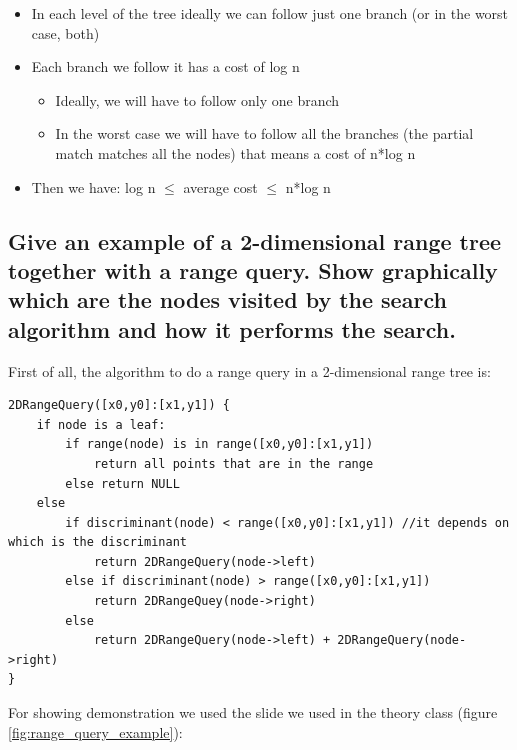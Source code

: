 \documentclass{article}
\begin{document}
\begin{itemize}
    \item In each level of the tree ideally we can follow just one branch (or in the worst case, both)
    \item Each branch we follow it has a cost of log n
    \begin{itemize}
        \item Ideally, we will have to follow only one branch
        \item In the worst case we will have to follow all the branches (the partial match matches all the nodes) that means a cost of n*log n
    \end{itemize}
    \item Then we have: log n $\leq$ average cost $\leq$ n*log n 
\end{itemize}


\subsection{Give an example of a 2-dimensional range tree together with a range query.
Show graphically which are the nodes visited by the search algorithm and
how it performs the search.}

First of all, the algorithm to do a range query in a 2-dimensional range tree is:
\begin{lstlisting}[caption=Algorithm to do a range query, style=myC]
2DRangeQuery([x0,y0]:[x1,y1]) {
    if node is a leaf:
        if range(node) is in range([x0,y0]:[x1,y1])
            return all points that are in the range
        else return NULL
    else
        if discriminant(node) < range([x0,y0]:[x1,y1]) //it depends on which is the discriminant
            return 2DRangeQuery(node->left)
        else if discriminant(node) > range([x0,y0]:[x1,y1])
            return 2DRangeQuey(node->right)
        else
            return 2DRangeQuery(node->left) + 2DRangeQuery(node->right)
}
\end{lstlisting}

For showing demonstration we used the slide we used in the theory class (figure \ref{fig:range_query_example}):
\end{document}
